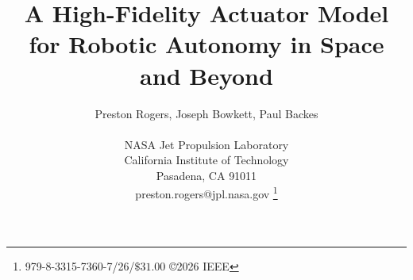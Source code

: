 \documentclass[twocolumn,letterpaper]{IEEEAerospaceCLS}  %
\begin{document}
\title{A High-Fidelity Actuator Model for Robotic Autonomy in Space and Beyond}

\author{Preston Rogers, Joseph Bowkett, Paul Backes \\
\\
NASA Jet Propulsion Laboratory\\
California Institute of Technology\\
Pasadena, CA 91011\\
preston.rogers@jpl.nasa.gov%
\thanks{\footnotesize 979-8-3315-7360-7/26/$\$31.00$ \copyright2026 IEEE}
}

\maketitle
\end{document}
